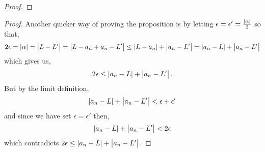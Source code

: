 \documentclass[../MathsNotesBase.tex]{subfiles}
\begin{document}
{\begin{proof}
		\end{proof}
		\begin{proof}
			Another quicker way of proving the proposition is by letting $ \epsilon = \epsilon' = \frac{\left\lvert\alpha\right\rvert}{2} $ so that,
			\[ 2\epsilon = \left\lvert\alpha\right\rvert = \left\lvert L - L'\right\rvert = \left\lvert L - a_n + a_n - L'\right\rvert \leq \left\lvert L - a_n\right\rvert + \left\lvert a_n - L'\right\rvert = \left\lvert a_n - L\right\rvert + \left\lvert a_n - L'\right\rvert \]
			which gives us,
			\[ 2\epsilon \leq \left\lvert a_n - L\right\rvert + \left\lvert a_n - L'\right\rvert. \]
			But by the limit definition,
			\[ \left\lvert a_n - L\right\rvert + \left\lvert a_n - L'\right\rvert < \epsilon + \epsilon' \]
			and since we have set $ \epsilon = \epsilon' $ then,
			\[ \left\lvert a_n - L\right\rvert + \left\lvert a_n - L'\right\rvert < 2\epsilon \]
			which contradicts $ 2\epsilon \leq \left\lvert a_n - L\right\rvert + \left\lvert a_n - L'\right\rvert $.
		\end{proof}
	
		\bigskip\bigskip
		
}
\end{document}
